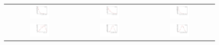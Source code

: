 \begin{figure}
\centering
\begin{tabular}{ccc}
\includegraphics[width=0.3\textwidth]{ANA_resources/Plots/Monte_carlo/data_vs_MC/weight/Kpi/acos(Bd_DIRA_OWNPV)_2012.pdf} & \includegraphics[width=0.3\textwidth]{ANA_resources/Plots/Monte_carlo/data_vs_MC/weight/Kpi/Bd_IPCHI2_OWNPV_2012.pdf} & \includegraphics[width=0.3\textwidth]{ANA_resources/Plots/Monte_carlo/data_vs_MC/weight/Kpi/Bd_LOKI_VFASPF_VCHI2VDOF_2012.pdf} \\
\includegraphics[width=0.3\textwidth]{ANA_resources/Plots/Monte_carlo/data_vs_MC/weight/Kpi/Bd_ptasy_1_50_2012.pdf} & \includegraphics[width=0.3\textwidth]{ANA_resources/Plots/Monte_carlo/data_vs_MC/weight/Kpi/log10(D0_IPCHI2_OWNPV)_2012.pdf} & \includegraphics[width=0.3\textwidth]{ANA_resources/Plots/Monte_carlo/data_vs_MC/weight/Kpi/log10(KstarK_IPCHI2_OWNPV)_2012.pdf} \\

\end{tabular}
\end{figure}
